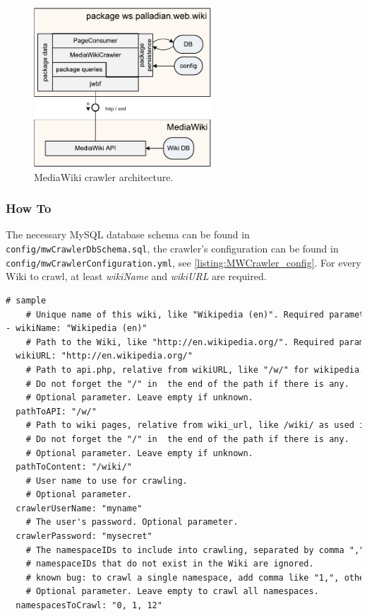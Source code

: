 \begin{figure}[ht!]
\centering
\includegraphics[width=0.6\textwidth]{img/MediaWiki_Crawler_Architecture.pdf}
\caption{MediaWiki crawler architecture.}
\label{fig:MWCrawler-architecture}
\end{figure}

\subsubsection{How To}
The necessary MySQL database schema can be found in \texttt{config/mwCrawlerDbSchema.sql}, the crawler's configuration can be found in \texttt{config/mwCrawlerConfiguration.yml}, see \ref{listing:MWCrawler_config}. For every Wiki to crawl, at least \emph{wikiName} and \emph{wikiURL} are required.

\begin{codelisting}
\begin{lstlisting}[caption=MediaWiki crawler configuration.,frame=tb,language=tex,breaklines=true,label=listing:MWCrawler_config]
# sample
    # Unique name of this wiki, like "Wikipedia (en)". Required parameter.
- wikiName: "Wikipedia (en)"
    # Path to the Wiki, like "http://en.wikipedia.org/". Required parameter.
  wikiURL: "http://en.wikipedia.org/"
    # Path to api.php, relative from wikiURL, like "/w/" for wikipedia. Must not contain the file name api.php.
    # Do not forget the "/" in  the end of the path if there is any.
    # Optional parameter. Leave empty if unknown. 		
  pathToAPI: "/w/" 
    # Path to wiki pages, relative from wiki_url, like /wiki/ as used in wikipedia (resulting path is http://de.wikipedia.org/wiki/).         
    # Do not forget the "/" in  the end of the path if there is any. 
    # Optional parameter. Leave empty if unknown.
  pathToContent: "/wiki/"
    # User name to use for crawling.
    # Optional parameter. 
  crawlerUserName: "myname" 
    # The user's password. Optional parameter. 
  crawlerPassword: "mysecret"
    # The namespaceIDs to include into crawling, separated by comma ",". All pages within these namespaces are crawled.
    # namespaceIDs that do not exist in the Wiki are ignored.
    # known bug: to crawl a single namespace, add comma like "1,", otherwise all namespaces are crawled! 
    # Optional parameter. Leave empty to crawl all namespaces.
  namespacesToCrawl: "0, 1, 12" 
\end{lstlisting}
\end{codelisting}

